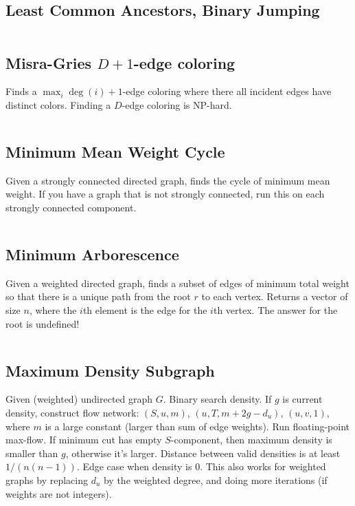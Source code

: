\documentclass[8pt,a4paper,landscape,oneside]{amsart}
\newcommand{\mintedstyle}[2]{\inputminted[fontsize=\normalsize,baselinestretch=.9,breaklines,tabsize=2]{#1}{code/#2}}
\newcommand{\code}[1]{\mintedstyle{cpp}{#1}}
\begin{document}
\begin{multicols*}{3}
\subsection{Least Common Ancestors, Binary Jumping}
\code{graphs/lca.cpp}


\subsection{Misra-Gries $D+1$-edge coloring}
Finds a $\max_i \deg(i) + 1$-edge coloring where there all incident edges have distinct colors.
Finding a $D$-edge coloring is NP-hard.
\code{graphs/MisraGries.cpp}

\subsection{Minimum Mean Weight Cycle}
Given a strongly connected directed graph, finds the cycle of minimum
mean weight. If you have a graph that is not strongly connected, run
this on each strongly connected component.
\code{graphs/min_mean_cycle.cpp}

\subsection{Minimum Arborescence}
Given a weighted directed graph, finds a subset of edges of minimum
total weight so that there is a unique path from the root $r$ to each
vertex. Returns a vector of size $n$, where the $i$th element is the
edge for the $i$th vertex. The answer for the root is undefined!
\code{graphs/arborescence.cpp}


\subsection{Maximum Density Subgraph}
Given (weighted) undirected graph $G$. Binary search density. If $g$ is
current density, construct flow network: $(S, u, m)$, $(u, T,
m+2g-d_u)$, $(u,v,1)$, where $m$ is a large constant (larger than sum
of edge weights). Run floating-point max-flow. If minimum cut has empty
$S$-component, then maximum density is smaller than $g$, otherwise it's
larger. Distance between valid densities is at least $1/(n(n-1))$. Edge
case when density is $0$. This also works for weighted graphs by
replacing $d_u$ by the weighted degree, and doing more iterations (if
weights are not integers).


\end{multicols*}
\end{document}
